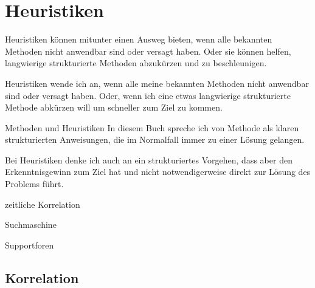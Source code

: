\chapter{Heuristiken}
\label{cha:heuristiken}

\begin{abstractsec}
  Heuristiken können mitunter einen Ausweg bieten, wenn alle bekannten
  Methoden nicht anwendbar sind oder versagt haben. Oder sie können helfen,
  langwierige strukturierte Methoden abzukürzen und zu beschleunigen.
\end{abstractsec}

\begin{normaltext}
  Heuristiken wende ich an, wenn alle meine bekannten Methoden nicht
  anwendbar sind oder versagt haben. Oder, wenn ich eine etwas langwierige
  strukturierte Methode abkürzen will um schneller zum Ziel zu kommen.

  \begin{Exkursbox}{Methoden und Heuristiken}
    In diesem Buch spreche ich von Methode als klaren strukturierten
    Anweisungen, die im Normalfall immer zu einer Lösung gelangen.

    Bei Heuristiken denke ich auch an ein strukturiertes
    Vorgehen, dass aber den Erkenntnisgewinn zum Ziel hat und nicht
    notwendigerweise direkt zur Lösung des Problems führt.
  \end{Exkursbox}
\end{normaltext}

\begin{notes}
\item zeitliche Korrelation
\item Suchmaschine
\item Supportforen
\end{notes}

\section{Korrelation}
\label{sec:korrelation}



